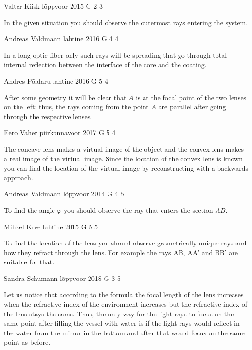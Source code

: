 \documentclass[11pt]{article}
\begin{document}
{Valter Kiisk} %
{lõppvoor} %
{2015} %
{G 2} %
{3} %
{

\ifEngHint
In the given situation you should observe the outermost rays entering the system.
\fi
}

{Andreas Valdmann} %
{lahtine} %
{2016} %
{G 4} %
{4} %
{

\ifEngHint
In a long optic fiber only such rays will be spreading that go through total internal reflection between the interface of the core and the coating.
\fi
}

{Andres Põldaru} %
{lahtine} %
{2016} %
{G 5} %
{4} %
{

\ifEngHint
After some geometry it will be clear that $A$ is at the focal point of the two lenses on the left; thus, the rays coming from the point $A$ are parallel after going through the respective lenses.
\fi
}

{Eero Vaher} %
{piirkonnavoor} %
{2017} %
{G 5} %
{4} %
{

\ifEngHint
The concave lens makes a virtual image of the object and the convex lens makes a real image of the virtual image. Since the location of the convex lens is known you can find the location of the virtual image by reconstructing with a backwards approach.
\fi
}

{Andreas Valdmann} %
{lõppvoor} %
{2014} %
{G 4} %
{5} %
{

\ifEngHint
To find the angle $\varphi$ you should observe the ray that enters the section $AB$.
\fi
}

{Mihkel Kree} %
{lahtine} %
{2015} %
{G 5} %
{5} %
{

\ifEngHint
To find the location of the lens you should observe geometrically unique rays and how they refract through the lens. For example the rays AB, AA’ and BB’ are suitable for that.
\fi
}

{Sandra Schumann} %
{lõppvoor} %
{2018} %
{G 3} %
{5} %
{

\ifEngHint
Let us notice that according to the formula the focal length of the lens increases when the refractive index of the environment increases but the refractive index of the lens stays the same. Thus, the only way for the light rays to focus on the same point after filling the vessel with water is if the light rays would reflect in the water from the mirror in the bottom and after that would focus on the same point as before.
\fi
}
\end{document}
